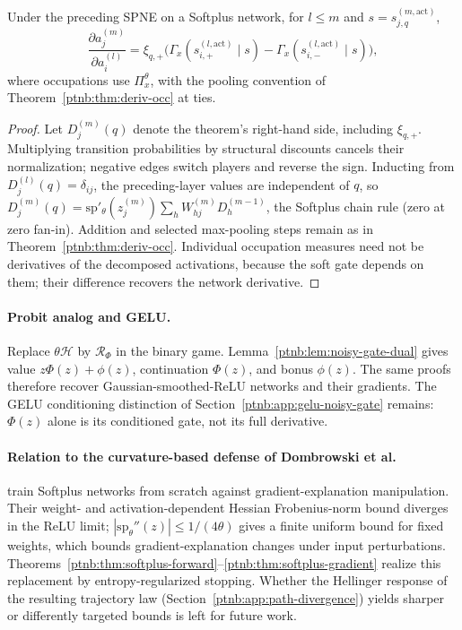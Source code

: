 \begin{theoremenv}\label{ptnb:thm:softplus-gradient}
Under the preceding SPNE on a Softplus network, for $l\le m$ and $s=s_{j,q}^{(m,\mathrm{act})}$,
\begin{equation}
    \frac{\partial a_j^{(m)}}{\partial a_i^{(l)}}=
    \xi_{q,+}\bigl(\Gamma_x(s_{i,+}^{(l,\mathrm{act})}\mid s)
                 -\Gamma_x(s_{i,-}^{(l,\mathrm{act})}\mid s)\bigr),
\end{equation}
where occupations use $\Pi_x^\theta$, with the pooling convention of
Theorem~\ref{ptnb:thm:deriv-occ} at ties.
\end{theoremenv}
\begin{proof}
Let $D_j^{(m)}(q)$ denote the theorem's right-hand side, including $\xi_{q,+}$.
Multiplying transition probabilities by structural discounts cancels their normalization;
negative edges switch players and reverse the sign. Inducting from
$D_j^{(l)}(q)=\delta_{ij}$, the preceding-layer values are independent of $q$, so
$D_j^{(m)}(q)=\mathrm{sp}'_\theta(z_j^{(m)})\sum_hW_{hj}^{(m)}D_h^{(m-1)}$,
the Softplus chain rule (zero at zero fan-in). Addition and selected max-pooling steps remain as
in Theorem~\ref{ptnb:thm:deriv-occ}. Individual occupation measures need not be derivatives of the decomposed activations, because the soft gate depends on them; their difference recovers the network derivative.
\end{proof}

\paragraph{Probit analog and GELU.}
Replace $\theta\mathcal H$ by $\mathcal R_\Phi$ in the binary game. Lemma~\ref{ptnb:lem:noisy-gate-dual}
gives value $z\Phi(z)+\phi(z)$, continuation $\Phi(z)$, and bonus $\phi(z)$. The same proofs therefore
recover Gaussian-smoothed-ReLU networks and their gradients. The GELU conditioning distinction of
Section~\ref{ptnb:app:gelu-noisy-gate} remains: $\Phi(z)$ alone is its conditioned gate, not its full
derivative.

\paragraph{Relation to the curvature-based defense of Dombrowski et al.}\label{ptnb:app:softplus-dombrowski}
\textcite{Dombrowski2020} train Softplus networks from scratch against gradient-explanation
manipulation. Their weight- and activation-dependent Hessian Frobenius-norm bound diverges in the
ReLU limit; $|\mathrm{sp}_\theta''(z)|\le1/(4\theta)$ gives a finite uniform bound for fixed weights,
which bounds gradient-explanation changes under input perturbations.
Theorems~\ref{ptnb:thm:softplus-forward}--\ref{ptnb:thm:softplus-gradient} realize this replacement by
entropy-regularized stopping. Whether the Hellinger response of the resulting trajectory law (Section~\ref{ptnb:app:path-divergence}) yields sharper or differently targeted bounds is left for future work.
